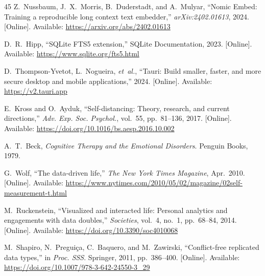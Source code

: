 \documentclass[conference]{IEEEtran}
\begin{document}
\begin{thebibliography}{45}
Z.~Nussbaum, J.~X.~Morris, B.~Duderstadt, and A.~Mulyar, ``Nomic Embed: Training a reproducible long context text embedder,'' \emph{arXiv:2402.01613}, 2024. [Online]. Available: \url{https://arxiv.org/abs/2402.01613}

D.~R.~Hipp, ``SQLite FTS5 extension,'' SQLite Documentation, 2023. [Online]. Available: \url{https://www.sqlite.org/fts5.html}

D.~Thompson-Yvetot, L.~Nogueira, \emph{et~al.}, ``Tauri: Build smaller, faster, and more secure desktop and mobile applications,'' 2024. [Online]. Available: \url{https://v2.tauri.app}

E.~Kross and O.~Ayduk, ``Self-distancing: Theory, research, and current directions,'' \emph{Adv. Exp. Soc. Psychol.}, vol.~55, pp.~81--136, 2017. [Online]. Available: \url{https://doi.org/10.1016/bs.aesp.2016.10.002}

A.~T.~Beck, \emph{Cognitive Therapy and the Emotional Disorders}. Penguin Books, 1979.

G.~Wolf, ``The data-driven life,'' \emph{The New York Times Magazine}, Apr.~2010. [Online]. Available: \url{https://www.nytimes.com/2010/05/02/magazine/02self-measurement-t.html}

M.~Ruckenstein, ``Visualized and interacted life: Personal analytics and engagements with data doubles,'' \emph{Societies}, vol.~4, no.~1, pp.~68--84, 2014. [Online]. Available: \url{https://doi.org/10.3390/soc4010068}

M.~Shapiro, N.~Pregui\c{c}a, C.~Baquero, and M.~Zawirski, ``Conflict-free replicated data types,'' in \emph{Proc. SSS}. Springer, 2011, pp.~386--400. [Online]. Available: \url{https://doi.org/10.1007/978-3-642-24550-3_29}

\end{thebibliography}
\end{document}
